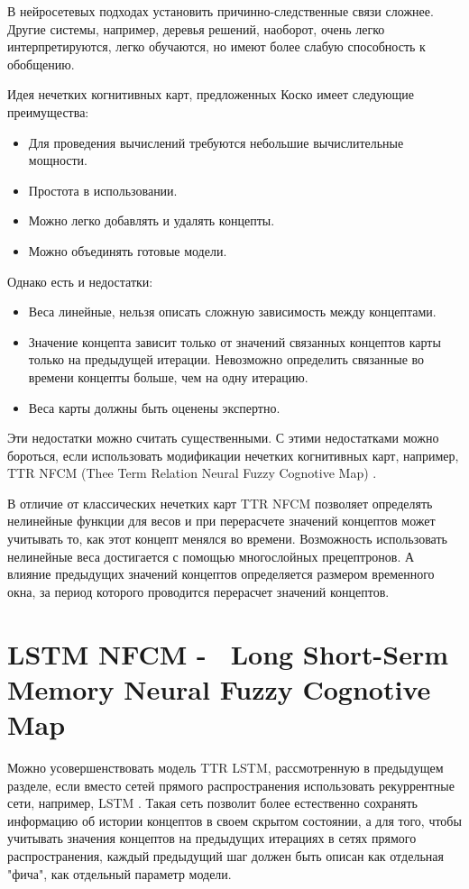 В нейросетевых подходах установить причинно-следственные связи сложнее.
Другие системы, например, деревья решений, наоборот, очень легко интерпретируются, легко обучаются,
но имеют более слабую способность к обобщению.

Идея нечетких когнитивных карт, предложенных Коско \cite{kosko1986fuzzy} имеет следующие преимущества:

\begin{itemize}
	\item Для проведения вычислений требуются небольшие вычислительные мощности.
	\item Простота в использовании.
	\item Можно легко добавлять и удалять концепты.
	\item Можно объединять готовые модели.
\end{itemize}

Однако есть и недостатки:

\begin{itemize}
	\item Веса линейные, нельзя описать сложную зависимость между концептами.
	\item Значение концепта зависит только от значений связанных концептов карты только на предыдущей итерации.
	Невозможно определить связанные во времени концепты больше, чем на одну итерацию.
	\item Веса карты должны быть оценены экспертно.
\end{itemize}

Эти недостатки можно считать существенными.
С этими недостатками можно бороться, если использовать модификации нечетких когнитивных карт,
например, TTR NFCM (Thee Term Relation Neural Fuzzy Cognotive Map) \cite{threeTermNfcm}.

В отличие от классических нечетких карт TTR NFCM позволяет
определять нелинейные функции для весов и при перерасчете значений концептов может учитывать то, как
этот концепт менялся во времени. Возможность использовать нелинейные веса достигается с помощью многослойных прецептронов.
А влияние предыдущих значений концептов определяется размером временного окна, за период которого проводится перерасчет
значений концептов.

\section{LSTM NFCM -~ Long Short-Serm Memory Neural Fuzzy Cognotive Map}

Можно усовершенствовать модель TTR LSTM, рассмотренную в предыдущем разделе,
если вместо сетей прямого распространения использовать рекуррентные сети,
например, LSTM \cite{LSTM_paper}. Такая сеть позволит более естественно
сохранять информацию об истории концептов в своем скрытом состоянии,
а для того, чтобы учитывать значения концептов на предыдущих итерациях
в сетях прямого распространения, каждый предыдущий шаг должен быть
описан как отдельная "фича", как отдельный параметр модели.

